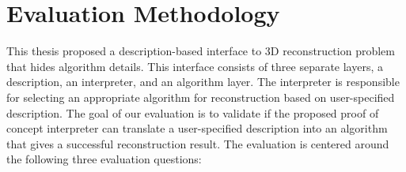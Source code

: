 
\section{Evaluation Methodology}
\label{sec:interp_eval_methodology}

This thesis proposed a description-based interface to 3D reconstruction problem that hides algorithm details. This interface consists of three separate layers, a description, an interpreter, and an algorithm layer. The interpreter is responsible for selecting an appropriate algorithm for reconstruction based on user-specified description. The goal of our evaluation is to validate if the proposed proof of concept interpreter can translate a user-specified description into an algorithm that gives a successful reconstruction result. The evaluation is centered around the following three evaluation questions:



